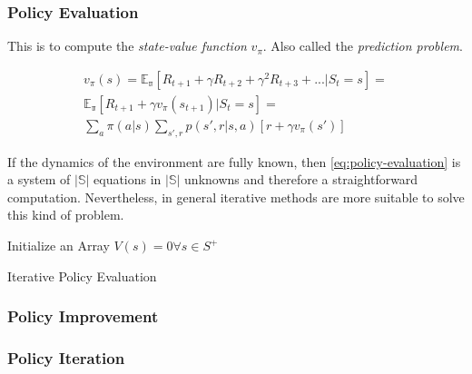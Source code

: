 \documentclass[paper=a4,fontsize=11pt]{scrartcl} %
\numberwithin{equation}{section} %
\numberwithin{figure}{section} %
\numberwithin{table}{section} %
\begin{document}
\subsubsection{Policy Evaluation}

This is to compute the \textit{state-value function} $v_\pi$. 
Also called the \textit{prediction problem}.

\begin{equation}
    \begin{aligned}
        v_\pi(s) = \mathbb{E_\pi} \left[ 
            R_{t+1} + \gamma R_{t+2} + \gamma^2 R_{t+3} + ... | S_t = s
        \right] = \\ 
        \mathbb{E_\pi} \left[ 
            R_{t+1} + \gamma v_\pi(s_{t+1}) | S_t = s
        \right] = \\
        \sum_a \pi(a|s) \sum_{s',r} p(s',r|s, a) \left[ r + \gamma v_\pi(s') \right]
    \end{aligned}
    \label{eq:policy-evaluation}
\end{equation}

If the dynamics of the environment are fully known, then \ref{eq:policy-evaluation}
is a system of $|\mathbb{S}|$ equations in $|\mathbb{S}|$ unknowns and therefore
a straightforward computation. Nevertheless, in general iterative methods are more 
suitable to solve this kind of problem. \\

\begin{algorithm}[H]
    \SetAlgoLined
     Initialize an Array $V(s)=0 \forall s \in S^+ $ \;
     \caption{Iterative Policy Evaluation}
\end{algorithm}

\subsubsection{Policy Improvement}

\subsubsection{Policy Iteration}
\end{document}
